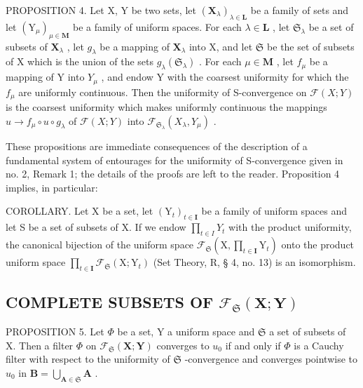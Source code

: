 PROPOSITION 4. Let X, Y be two sets, let \((\mathbf{X}_{\lambda})_{\lambda \in \mathbf{L}}\) be a family of sets and let \((\mathrm{Y}_{\mu})_{\mu \in \mathbf{M}}\) be a family of uniform spaces. For each \(\lambda \in \mathbf{L}\) , let \(\mathfrak{S}_{\lambda}\) be a set of subsets of \(\mathbf{X}_{\lambda}\) , let \(g_{\lambda}\) be a mapping of \(\mathbf{X}_{\lambda}\) into X, and let \(\mathfrak{S}\) be the set of subsets of X which is the union of the sets \(g_{\lambda}(\mathfrak{S}_{\lambda})\) . For each \(\mu \in \mathbf{M}\) , let \(f_{\mu}\) be a mapping of Y into \(Y_{\mu}\) , and endow Y with the coarsest uniformity for which the \(f_{\mu}\) are uniformly continuous. Then the uniformity of S-convergence on \(\mathcal{F}(X;Y)\) is the coarsest uniformity which makes uniformly continuous the mappings \(u \to f_{\mu} \circ u \circ g_{\lambda}\) of \(\mathcal{F}(X;Y)\) into \(\mathcal{F}_{\mathfrak{S}_{\lambda}}(X_{\lambda},Y_{\mu})\) .

These propositions are immediate consequences of the description of a fundamental system of entourages for the uniformity of S-convergence given in no. 2, Remark 1; the details of the proofs are left to the reader. Proposition 4 implies, in particular:

COROLLARY. Let X be a set, let \((\mathrm{Y}_{t})_{t\in\mathbf{I}}\) be a family of uniform spaces and let S be a set of subsets of X. If we endow \(\prod_{t\in I}Y_{t}\) with the product uniformity, the canonical bijection of the uniform space \(\mathcal{F}_{\mathfrak{S}}\left(\mathrm{X},\prod_{t\in\mathbf{I}}\mathrm{Y}_{t}\right)\) onto the product uniform space \(\prod_{t\in\mathbf{I}}\mathcal{F}_{\mathfrak{S}}(\mathrm{X};\mathrm{Y}_{t})\) (Set Theory, R, § 4, no. 13) is an isomorphism.

\subsection{\texorpdfstring{COMPLETE SUBSETS OF \(\mathcal{F}_{\mathfrak{S}}(\mathbf{X};\mathbf{Y})\)}{COMPLETE SUBSETS OF F SUB S (X;Y)}}

PROPOSITION 5. Let \(\Phi\) be a set, Y a uniform space and \(\mathfrak{S}\) a set of subsets of X. Then a filter \(\Phi\) on \(\mathcal{F}_{\mathfrak{S}}(\mathbf{X};\mathbf{Y})\) converges to \(u_0\) if and only if \(\Phi\) is a Cauchy filter with respect to the uniformity of \(\mathfrak{S}\) -convergence and converges pointwise to \(u_0\) in \(\mathbf{B} = \bigcup_{\mathbf{A}\in \mathfrak{S}}\mathbf{A}\) .

